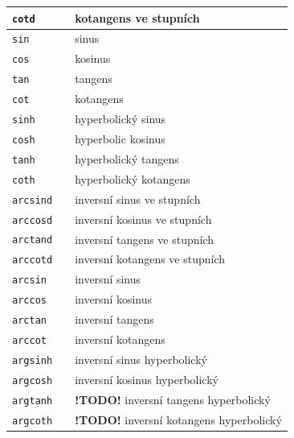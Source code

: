 \documentclass[a4paper,10pt]{article}
\begin{document}
\begin{tabularx}{\textwidth}{|l|l|X|}
    \verb+cotd+ && kotangens ve stupních\\\hline
    \verb+sin+  && sinus\\\hline
    \verb+cos+  && kosinus\\\hline
    \verb+tan+  && tangens\\\hline
    \verb+cot+  && kotangens\\\hline
    \hline
    \verb+sinh+ && hyperbolický sinus\\\hline
    \verb+cosh+ && hyperbolic kosinus\\\hline
    \verb+tanh+ && hyperbolický tangens\\\hline
    \verb+coth+ && hyperbolický kotangens\\\hline
    \hline
    \verb+arcsind+ && inversní sinus ve stupních\\\hline
    \verb+arccosd+ && inversní kosinus ve stupních\\\hline
    \verb+arctand+ && inversní tangens ve stupních\\\hline
    \verb+arccotd+ && inversní kotangens ve stupních\\\hline
    \verb+arcsin+  && inversní sinus\\\hline
    \verb+arccos+  && inversní kosinus\\\hline
    \verb+arctan+ && inversní tangens\\\hline
    \verb+arccot+ && inversní kotangens\\\hline 
    \verb+argsinh+  && inversní sinus hyperbolický\\\hline
    \verb+argcosh+  && inversní kosinus hyperbolický\\\hline

    \verb+argtanh+  && {\bf !TODO!} inversní tangens hyperbolický\\\hline
    \verb+argcoth+  && {\bf !TODO!} inversní kotangens hyperbolický\\\hline
\end{tabularx}\bigskip
\end{document}
